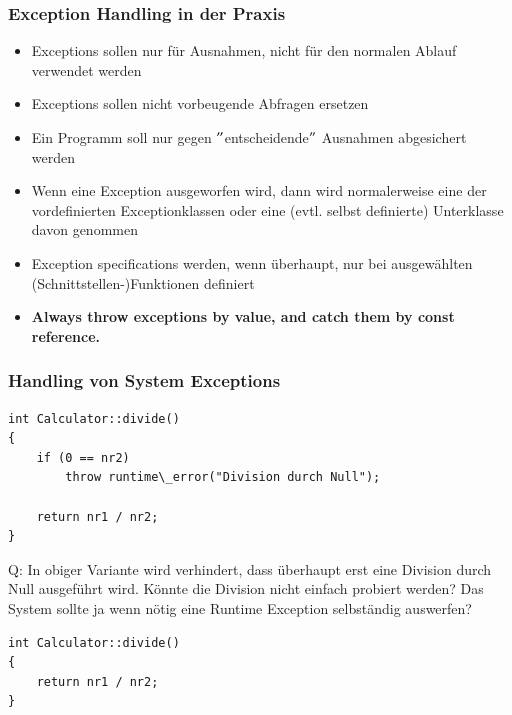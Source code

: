\subsubsection{Exception Handling in der Praxis}
\begin{itemize}
	\item Exceptions sollen nur für Ausnahmen, nicht für den normalen Ablauf verwendet werden
	\item Exceptions sollen nicht vorbeugende Abfragen ersetzen
	\item Ein Programm soll nur gegen $"$entscheidende$"$ Ausnahmen abgesichert werden
	\item Wenn eine Exception ausgeworfen wird, dann wird normalerweise eine der vordefinierten Exceptionklassen oder eine (evtl. selbst definierte) Unterklasse davon genommen
	\item Exception specifications werden, wenn überhaupt, nur bei ausgewählten (Schnittstellen-)Funktionen definiert
	\item \textbf{Always throw exceptions by value, and catch them by const reference.}
\end{itemize}

\subsubsection{Handling von System Exceptions}
\begin{multicols}{2}
\begin{minipage}{\linewidth}
\vspace{-\baselineskip}
\begin{lstlisting}
int Calculator::divide()
{
	if (0 == nr2)
		throw runtime\_error("Division durch Null");
	
	return nr1 / nr2;
}
\end{lstlisting}
\end{minipage}
\vfill\null
\columnbreak
Q: In obiger Variante wird verhindert, dass überhaupt erst eine Division durch Null ausgeführt wird. Könnte die Division nicht einfach probiert werden? Das System sollte ja wenn nötig eine Runtime Exception selbständig auswerfen?
\begin{minipage}{\linewidth}
\vspace{-\baselineskip}
\begin{lstlisting}
int Calculator::divide()
{
	return nr1 / nr2;
}
\end{lstlisting}
\end{minipage}
\end{multicols}

